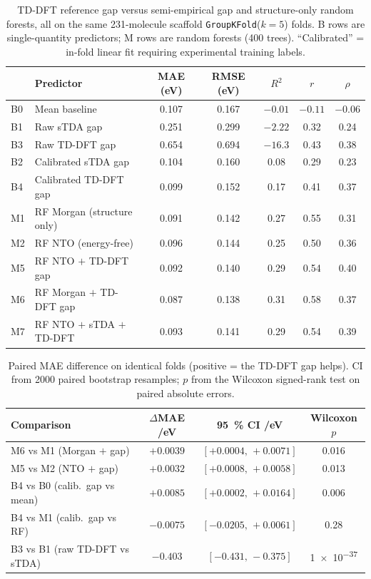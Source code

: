 \documentclass[final,3p,times,twocolumn]{elsarticle}
\begin{document}
\begin{table}[htbp]
  \centering
  \caption{TD-DFT reference gap versus semi-empirical gap and structure-only
    random forests, all on the same \num{231}-molecule scaffold
    \texttt{GroupKFold}($k=5$) folds. B rows are single-quantity predictors;
    M rows are random forests (\num{400} trees). ``Calibrated'' = in-fold linear
    fit requiring experimental training labels.}
  \label{tab:tddft_headtohead}
  \small
  \begin{tabular}{llccccc}
    \toprule
    & Predictor & MAE (eV) & RMSE (eV) & $R^2$ & $r$ & $\rho$ \\
    \midrule
    B0 & Mean baseline                 & 0.107 & 0.167 & $-0.01$  & $-0.11$ & $-0.06$ \\
    B1 & Raw sTDA gap                  & 0.251 & 0.299 & $-2.22$  & 0.32 & 0.24 \\
    B3 & Raw TD-DFT gap                & 0.654 & 0.694 & $-16.3$  & 0.43 & 0.38 \\
    B2 & Calibrated sTDA gap           & 0.104 & 0.160 & 0.08     & 0.29 & 0.23 \\
    B4 & Calibrated TD-DFT gap         & 0.099 & 0.152 & 0.17     & 0.41 & 0.37 \\
    \midrule
    M1 & RF Morgan (structure only)    & 0.091 & 0.142 & 0.27 & 0.55 & 0.31 \\
    M2 & RF NTO (energy-free)          & 0.096 & 0.144 & 0.25 & 0.50 & 0.36 \\
    M5 & RF NTO $+$ TD-DFT gap         & 0.092 & 0.140 & 0.29 & 0.54 & 0.40 \\
    M6 & RF Morgan $+$ TD-DFT gap      & 0.087 & 0.138 & 0.31 & 0.58 & 0.37 \\
    M7 & RF NTO $+$ sTDA $+$ TD-DFT    & 0.093 & 0.141 & 0.29 & 0.54 & 0.39 \\
    \bottomrule
  \end{tabular}
\end{table}

\begin{table}[htbp]
  \centering
  \caption{Paired MAE difference on identical folds (positive = the TD-DFT gap
    helps). CI from \num{2000} paired bootstrap resamples; $p$ from the Wilcoxon
    signed-rank test on paired absolute errors.}
  \label{tab:tddft_paired}
  \small
  \begin{tabular}{lccc}
    \toprule
    Comparison & $\Delta$MAE /eV & \qty{95}{\percent} CI /eV & Wilcoxon $p$ \\
    \midrule
    M6 vs M1 (Morgan $+$ gap)      & $+0.0039$ & $[+0.0004,\,+0.0071]$ & 0.016 \\
    M5 vs M2 (NTO $+$ gap)         & $+0.0032$ & $[+0.0008,\,+0.0058]$ & 0.013 \\
    B4 vs B0 (calib.\ gap vs mean) & $+0.0085$ & $[+0.0002,\,+0.0164]$ & 0.006 \\
    B4 vs M1 (calib.\ gap vs RF)   & $-0.0075$ & $[-0.0205,\,+0.0061]$ & 0.28 \\
    B3 vs B1 (raw TD-DFT vs sTDA)  & $-0.403$  & $[-0.431,\,-0.375]$   & \num{1e-37} \\
    \bottomrule
  \end{tabular}
\end{table}
\end{document}

